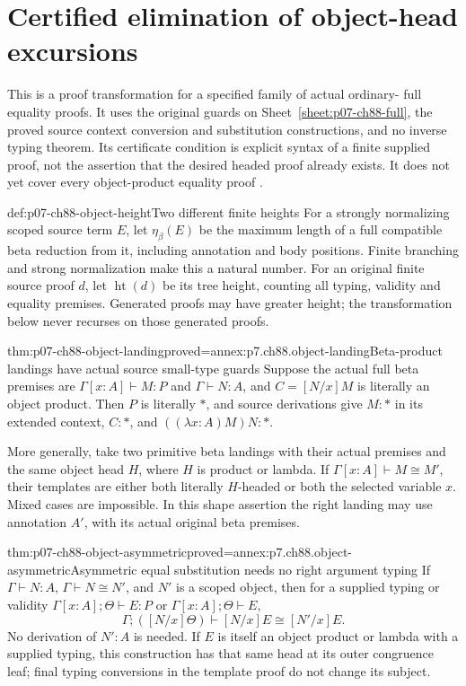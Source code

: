 \section{Certified elimination of object-head excursions}
\label{sec:p07-ch88-object-product}

This is a proof transformation for a specified family of actual ordinary-
full equality proofs. It uses the original guards on
Sheet~\ref{sheet:p07-ch88-full}, the proved source context conversion and
substitution constructions, and no inverse typing theorem. Its certificate
condition is explicit syntax of a finite supplied proof, not the assertion
that the desired headed proof already exists. It does not yet cover every
object-product equality proof \cite[pp.~99--102]{CoquandHuet1988}.

\begin{hbdefinition}{def:p07-ch88-object-height}{Two different finite heights}
For a strongly normalizing scoped source term \(E\), let
\(\eta_\beta(E)\) be the maximum length of a full compatible beta
reduction from it, including annotation and body positions. Finite branching
and strong normalization make this a natural number. For an original
finite source proof \(d\), let \(\operatorname{ht}(d)\) be its tree
height, counting all typing, validity and equality premises. Generated
proofs may have greater height; the transformation below never recurses
on those generated proofs.
\end{hbdefinition}

\begin{hblemma}{thm:p07-ch88-object-landing}{proved=annex:p7.ch88.object-landing}{Beta-product landings have actual source small-type guards}
Suppose the actual full beta premises are
\(\Gamma[x:A]\vdash M:P\) and \(\Gamma\vdash N:A\), and
\(C=[N/x]M\) is literally an object product. Then \(P\) is literally
\(\ast\), and source derivations give \(M:\ast\) in its extended
context, \(C:\ast\), and \(((\lambda x:A)M)N:\ast\).

More generally, take two primitive beta landings with their actual
premises and the same object head \(H\), where \(H\) is product
or lambda. If
\(\Gamma[x:A]\vdash M\cong M'\), their templates are either
both literally \(H\)-headed or both the selected variable \(x\).
Mixed cases are impossible. In this shape assertion the right landing
may use annotation \(A'\), with its actual original beta premises.
\end{hblemma}

\begin{hbtheorem}{thm:p07-ch88-object-asymmetric}{proved=annex:p7.ch88.object-asymmetric}{Asymmetric equal substitution needs no right argument typing}
If \(\Gamma\vdash N:A\), \(\Gamma\vdash N\cong N'\), and
\(N'\) is a scoped object, then for a supplied typing or validity
\(\Gamma[x:A];\Theta\vdash E:P\) or \(\Gamma[x:A];\Theta\vdash E\),
\[
 \Gamma;([N/x]\Theta)\vdash[N/x]E\cong[N'/x]E.
\]
No derivation of \(N':A\) is needed. If \(E\) is itself an object
product or lambda with a supplied typing, this construction has that
same head at its outer congruence leaf; final typing conversions in the
template proof do not change its subject.
\end{hbtheorem}

